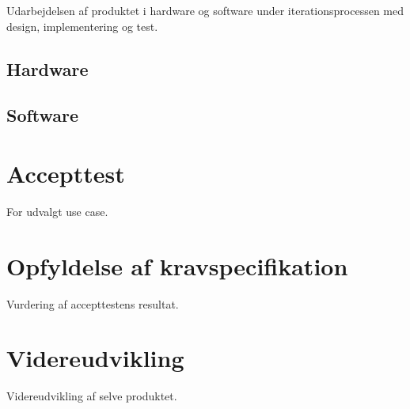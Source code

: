 Udarbejdelsen af produktet i hardware og software under iterationsprocessen med design, implementering og test.

\subsection{Hardware}

\subsection{Software}


\section{Accepttest}

For udvalgt use case.


\section{Opfyldelse af kravspecifikation}
Vurdering af accepttestens resultat.


\section{Videreudvikling}
Videreudvikling af selve produktet.
